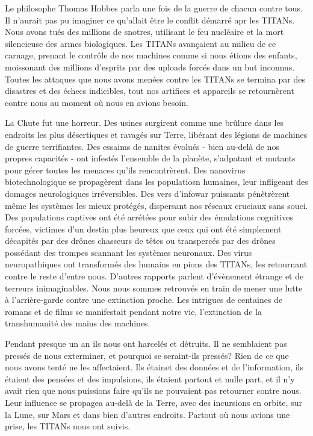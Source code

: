 Le philosophe Thomas Hobbes parla une fois de la guerre de chacun contre tous. Il n'aurait pas pu imaginer ce qu'allait être le conflit démarré apr les TITANs. Nous avons tués des millions de snotres, utilisant le feu nucléaire et la mort silencieuse des armes biologiques. Les TITANs avançaient au milieu de ce carnage, prenant le contrôle de nos machines comme si nous étions des enfants, moissonant des millions d'esprits par des uploads forcés dans un but inconnus. Toutes les attaques que nous avons menées contre les TITANs se termina par des disastres et des échecs indicibles, tout nos artifices et appareils se retournèrent contre nous au moment où nous en avions besoin. 

La Chute fut une horreur. Des usines surgirent comme une brûlure dans les endroits les plus désertiques et ravagés sur Terre, libérant des légions de machines de guerre terrifiantes. Des essaims de nanites évolués - bien au-delà de nos propres capacités - ont infestés l'ensemble de la planète, s'adpatant et mutants pour gérer toutes les menaces qu'ils rencontrèrent. Des nanovirus biotechnologique se propagèrent dans les populatiosn humaines, leur infligeant des domages neurologiques irréversibles. Des vers d'infowar puissants pénètrèrent même les systèmes les mieux protégés, dispersant nos réseaux cruciaux sans souci. Des populations captives ont été arrétées pour subir des émulations cognitives forcées, victimes d'un destin plus heureux que ceux qui ont été simplement décapités par des drônes chasseurs de têtes ou transpercés par des drônes possédant des trompes scannant les systèmes neuronaux. Des virus neuropathiques ont transformés des humains en pions des TITANs, les retournant contre le reste d'entre nous. D'autres rapports parlent d'évènement étrange et de terreurs inimaginables. Nous nous sommes retrouvés en train de mener une lutte à l'arrière-garde contre une extinction proche. Les intrigues de centaines de romans et de films se manifestait pendant notre vie, l'extinction de la transhumanité des mains des machines. 

Pendant presque un an ils nous ont harcelés et détruits. Il ne semblaient pas pressés de nous exterminer, et pourquoi se seraint-ils pressés? Rien de ce que nous avons tenté ne les affectaient. Ils étainet des données et de l'information, ils étaient des pensées et des impulsions, ils étaient partout et nulle part, et il n'y avait rien que nous puissions faire qu'ils ne pouvaient pas retourner contre nous. Leur influence se propagea au-delà de la Terre, avec des incursions en orbite, sur la Lune, sur Mars et dans bien d'autres endroits. Partout où nous avions une prise, les TITANs nous ont suivis. 

